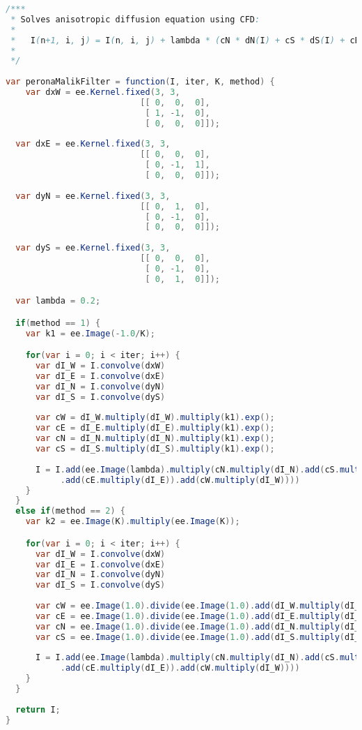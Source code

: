 \begin{lstlisting}[language=Java, basicstyle=\tiny]
/***
 * Solves anisotropic diffusion equation using CFD:
 *
 *   I(n+1, i, j) = I(n, i, j) + lambda * (cN * dN(I) + cS * dS(I) + cE * dE(I) + cW * dW(I))
 *
 */
 
var peronaMalikFilter = function(I, iter, K, method) {
    var dxW = ee.Kernel.fixed(3, 3,
                           [[ 0,  0,  0],
                            [ 1, -1,  0],
                            [ 0,  0,  0]]);
  
  var dxE = ee.Kernel.fixed(3, 3,
                           [[ 0,  0,  0],
                            [ 0, -1,  1],
                            [ 0,  0,  0]]);
  
  var dyN = ee.Kernel.fixed(3, 3,
                           [[ 0,  1,  0],
                            [ 0, -1,  0],
                            [ 0,  0,  0]]);
  
  var dyS = ee.Kernel.fixed(3, 3,
                           [[ 0,  0,  0],
                            [ 0, -1,  0],
                            [ 0,  1,  0]]);

  var lambda = 0.2;

  if(method == 1) {
    var k1 = ee.Image(-1.0/K);

    for(var i = 0; i < iter; i++) {
      var dI_W = I.convolve(dxW)
      var dI_E = I.convolve(dxE)
      var dI_N = I.convolve(dyN)
      var dI_S = I.convolve(dyS)
      
      var cW = dI_W.multiply(dI_W).multiply(k1).exp();
      var cE = dI_E.multiply(dI_E).multiply(k1).exp();
      var cN = dI_N.multiply(dI_N).multiply(k1).exp();
      var cS = dI_S.multiply(dI_S).multiply(k1).exp();
  
      I = I.add(ee.Image(lambda).multiply(cN.multiply(dI_N).add(cS.multiply(dI_S))
           .add(cE.multiply(dI_E)).add(cW.multiply(dI_W))))
    }
  }
  else if(method == 2) {
    var k2 = ee.Image(K).multiply(ee.Image(K));

    for(var i = 0; i < iter; i++) {
      var dI_W = I.convolve(dxW)
      var dI_E = I.convolve(dxE)
      var dI_N = I.convolve(dyN)
      var dI_S = I.convolve(dyS)
      
      var cW = ee.Image(1.0).divide(ee.Image(1.0).add(dI_W.multiply(dI_W).divide(k2)));
      var cE = ee.Image(1.0).divide(ee.Image(1.0).add(dI_E.multiply(dI_E).divide(k2)));
      var cN = ee.Image(1.0).divide(ee.Image(1.0).add(dI_N.multiply(dI_N).divide(k2)));
      var cS = ee.Image(1.0).divide(ee.Image(1.0).add(dI_S.multiply(dI_S).divide(k2)));
  
      I = I.add(ee.Image(lambda).multiply(cN.multiply(dI_N).add(cS.multiply(dI_S))
           .add(cE.multiply(dI_E)).add(cW.multiply(dI_W))))
    }
  }
  
  return I;
}
\end{lstlisting}
